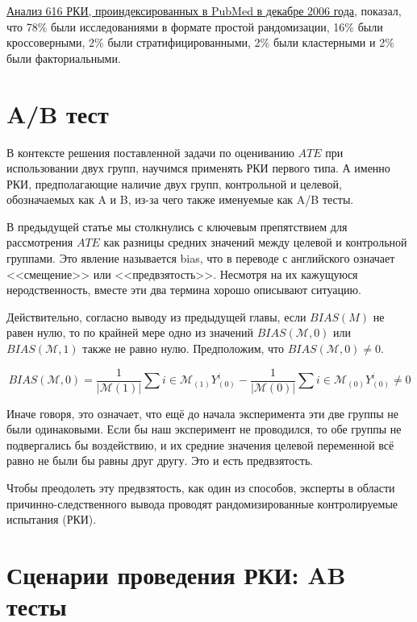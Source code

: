 \documentclass{article}
\begin{document}
    \href{https://www.bmj.com/content/340/bmj.c723.full}{Анализ 616 РКИ, проиндексированных в PubMed в декабре 2006 года}, показал, что 78\% были исследованиями в формате простой рандомизации, 16\% были кроссоверными, 2\% были стратифицированными, 2\% были кластерными и 2\% были факториальными.


    \section{A/B тест}

        В контексте решения поставленной задачи по оцениванию $ATE$ при использовании двух групп, научимся применять РКИ первого типа.
        А именно РКИ, предполагающие наличие двух групп, контрольной и целевой, обозначаемых как A и B, из-за чего также именуемые как A/B тесты.

        В предыдущей статье мы столкнулись с ключевым препятствием для рассмотрения $ATE$ как разницы средних значений между целевой и контрольной группами.
        Это явление называется bias, что в переводе с английского означает <<смещение>> или <<предвзятость>>.
        Несмотря на их кажущуюся неродственность, вместе эти два термина хорошо описывают ситуацию.

        Действительно, согласно выводу из предыдущей главы, если $BIAS(M)$ не равен нулю, то по крайней мере одно из значений $BIAS(\mathcal{M}, 0)$ или $BIAS(\mathcal{M}, 1)$ также не равно нулю.
        Предположим, что $BIAS(\mathcal{M}, 0) \neq 0$.

        \[
            BIAS(\mathcal{M}, 0) =
            \frac{1}{|\mathcal{M}{(1)}|} \displaystyle\sum{i\in\mathcal{M}_{(1)}}
            Y^i_{(0)} -
            \frac{1}{|\mathcal{M}{(0)}|} \displaystyle\sum{i\in\mathcal{M}_{(0)}}
            Y^i_{(0)} \neq 0
        \]

        Иначе говоря, это означает, что ещё до начала эксперимента эти две группы не были одинаковыми.
        Если бы наш эксперимент не проводился, то обе группы не подвергались бы воздействию, и их средние значения целевой переменной всё равно не были бы равны друг другу.
        Это и есть предвзятость.

        Чтобы преодолеть эту предвзятость, как один из способов, эксперты в области причинно-следственного вывода проводят рандомизированные контролируемые испытания (РКИ).
    \section{Сценарии проведения РКИ: AB тесты}
\end{document}
